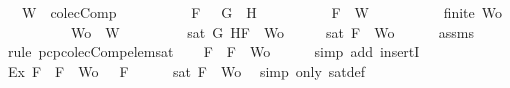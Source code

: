\begin{isabellebody}
\ \ \ {\isachardoublequoteopen}W\ {\isasymin}\ colecComp{\isachardoublequoteclose}\isanewline
\ \ \ \ \ \ \ \ \ \ {\isachardoublequoteopen}F\ {\isacharequal}\ \isactrlbold {\isasymnot}\ {\isacharparenleft}G\ \isactrlbold {\isasymrightarrow}\ H{\isacharparenright}{\isachardoublequoteclose}\isanewline
\ \ \ \ \ \ \ \ \ \ {\isachardoublequoteopen}F\ {\isasymin}\ W{\isachardoublequoteclose}\isanewline
\ \ \ \ \ \ \ \ \ \ {\isachardoublequoteopen}finite\ Wo{\isachardoublequoteclose}\isanewline
\ \ \ \ \ \ \ \ \ \ {\isachardoublequoteopen}Wo\ {\isasymsubseteq}\ W{\isachardoublequoteclose}\isanewline
\ \ \ \ \ \ \ \ \ {\isachardoublequoteopen}sat\ {\isacharparenleft}{\isacharbraceleft}G{\isacharcomma}\isactrlbold {\isasymnot}\ H{\isacharcomma}F{\isacharbraceright}\ {\isasymunion}\ Wo{\isacharparenright}{\isachardoublequoteclose}\isanewline
%
\isadelimproof
%
\endisadelimproof
%
\isatagproof
{}\isamarkupfalse%
\ {\isacharminus}\isanewline
\ \ \isamarkupfalse%
\ {\isachardoublequoteopen}sat\ {\isacharparenleft}{\isacharbraceleft}F{\isacharbraceright}\ {\isasymunion}\ Wo{\isacharparenright}{\isachardoublequoteclose}\isanewline
\ \ \ \ \isamarkupfalse%
\ assms{\isacharparenleft}{}{\isacharcomma}{}{\isacharcomma}{}{\isacharcomma}{}{\isacharparenright}\ \isamarkupfalse%
\ {\isacharparenleft}rule\ pcp{\isacharunderscore}colecComp{\isacharunderscore}elem{\isacharunderscore}sat{\isacharparenright}\isanewline
\ \ \isamarkupfalse%
\ {\isachardoublequoteopen}F\ {\isasymin}\ {\isacharbraceleft}F{\isacharbraceright}\ {\isasymunion}\ Wo{\isachardoublequoteclose}\isanewline
\ \ \ \ \isamarkupfalse%
\ {\isacharparenleft}simp\ add{\isacharcolon}\ insertI{}{\isacharparenright}\isanewline
\ \ \isamarkupfalse%
\ Ex{}{\isacharcolon}{\isachardoublequoteopen}{\isasymexists}{\isasymA}{\isachardot}\ {\isasymforall}F\ {\isasymin}\ {\isacharparenleft}{\isacharbraceleft}F{\isacharbraceright}\ {\isasymunion}\ Wo{\isacharparenright}{\isachardot}\ {\isasymA}\ {\isasymTurnstile}\ F{\isachardoublequoteclose}\isanewline
\ \ \ \ \isamarkupfalse%
\ {\isacartoucheopen}sat\ {\isacharparenleft}{\isacharbraceleft}F{\isacharbraceright}\ {\isasymunion}\ Wo{\isacharparenright}{\isacartoucheclose}\ \isamarkupfalse%
\ {\isacharparenleft}simp\ only{\isacharcolon}\ sat{\isacharunderscore}def{\isacharparenright}\isanewline
\ \ \isamarkupfalse%

\end{isabellebody}
